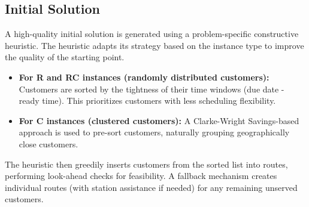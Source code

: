 \documentclass[a4paper,12pt]{article}
\begin{document}
\subsection{Initial Solution}
A high-quality initial solution is generated using a problem-specific constructive heuristic. The heuristic adapts its strategy based on the instance type to improve the quality of the starting point.
\begin{itemize}
    \item \textbf{For R and RC instances (randomly distributed customers):} Customers are sorted by the tightness of their time windows (due date - ready time). This prioritizes customers with less scheduling flexibility.
    \item \textbf{For C instances (clustered customers):} A Clarke-Wright Savings-based approach is used to pre-sort customers, naturally grouping geographically close customers.
\end{itemize}
The heuristic then greedily inserts customers from the sorted list into routes, performing look-ahead checks for feasibility. A fallback mechanism creates individual routes (with station assistance if needed) for any remaining unserved customers.
\end{document}

